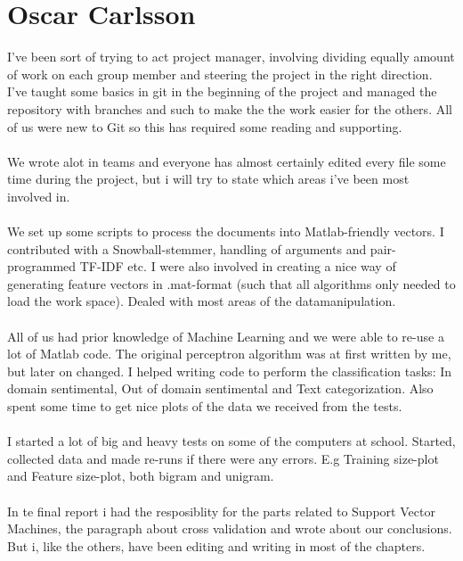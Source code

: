 \section*{Oscar Carlsson}
I've been sort of trying to act project manager, involving dividing equally amount of work on each group member and steering the project in the right direction. I've taught some basics in git in the beginning of the project and managed the repository with branches and such to make the the work easier for the others. All of us were new to Git so this has required some reading and supporting. \\\\
We wrote alot in teams and everyone has almost certainly edited every file some time during the project, but i will try to state which areas i've been most involved in. \\\\
We set up some scripts to process the documents into Matlab-friendly vectors. I contributed with a Snowball-stemmer, handling of arguments and pair-programmed TF-IDF etc. I were also involved in creating a nice way of generating feature vectors in .mat-format (such that all algorithms only needed to load the work space). Dealed with most areas of the datamanipulation.\\\\
All of us had prior knowledge of Machine Learning and we were able to re-use a lot of Matlab code. The original perceptron algorithm was at first written by me, but later on changed. I helped writing code to perform the classification tasks: In domain sentimental, Out of domain sentimental and Text categorization. Also spent some time to get nice plots of the data we received from the tests.\\\\
I started a lot of big and heavy tests on some of the computers at school. Started, collected data and made re-runs if there were any errors. E.g Training size-plot and Feature size-plot, both bigram and unigram.\\\\
In te final report i had the resposiblity for the parts related to Support Vector Machines, the paragraph about cross validation and wrote about our conclusions. But i, like the others, have been editing and writing in most of the chapters.\\\\